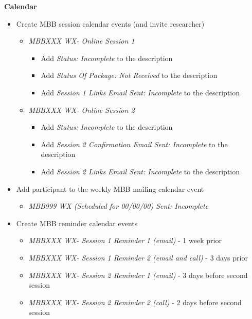 \documentclass[]{book}
\providecommand{\tightlist}{%
  \setlength{\itemsep}{0pt}\setlength{\parskip}{0pt}}
\begin{document}
\textbf{Calendar}

\begin{itemize}
\tightlist
\item
  Create MBB session calendar events (and invite researcher)

  \begin{itemize}
  \tightlist
  \item
    \emph{MBBXXX WX- Online Session 1}

    \begin{itemize}
    \tightlist
    \item
      Add \emph{Status: Incomplete} to the description
    \item
      Add \emph{Status Of Package: Not Received} to the description
    \item
      Add \emph{Session 1 Links Email Sent: Incomplete} to the description
    \end{itemize}
  \item
    \emph{MBBXXX WX- Online Session 2}

    \begin{itemize}
    \tightlist
    \item
      Add \emph{Status: Incomplete} to the description
    \item
      Add \emph{Session 2 Confirmation Email Sent: Incomplete} to the description
    \item
      Add \emph{Session 2 Links Email Sent: Incomplete} to the description
    \end{itemize}
  \end{itemize}
\item
  Add participant to the weekly MBB mailing calendar event

  \begin{itemize}
  \tightlist
  \item
    \emph{MBB999 WX (Scheduled for 00/00/00) Sent: Incomplete}
  \end{itemize}
\item
  Create MBB reminder calendar events

  \begin{itemize}
  \tightlist
  \item
    \emph{MBBXXX WX- Session 1 Reminder 1 (email)} - 1 week prior
  \item
    \emph{MBBXXX WX- Session 1 Reminder 2 (email and call)} - 3 days prior
  \item
    \emph{MBBXXX WX- Session 2 Reminder 1 (email) } - 3 days before second session
  \item
    \emph{MBBXXX WX- Session 2 Reminder 2 (call)} - 2 days before second session
  \end{itemize}
\end{itemize}
\end{document}
